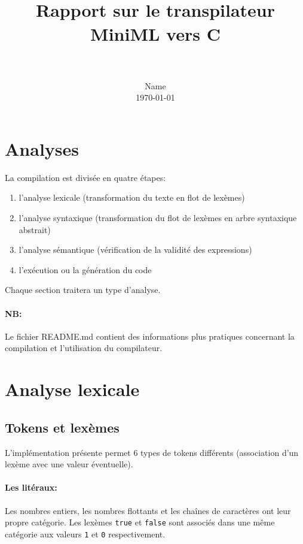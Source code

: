 \documentclass[paper=a4, fontsize=11pt]{scrartcl}
\title{
		\vspace{-1in} 	
		\usefont{OT1}{bch}{b}{n}
		\horrule{0.5pt} \\[0.4cm]
		\huge Rapport sur le transpilateur MiniML vers C \\
		\horrule{2pt} \\[0.5cm]
}
\author{
		\normalfont 								\normalsize
        Name \\[-3pt]		\normalsize
        \today
}
\date{}
\numberwithin{equation}{section}		%
\numberwithin{figure}{section}			%
\numberwithin{table}{section}				%
\begin{document}
\maketitle

\tableofcontents

\newpage
\section{Analyses}

La compilation est divisée en quatre étapes:

\begin{enumerate}
\item l'analyse lexicale (transformation du texte en flot de lexèmes)
\item l'analyse syntaxique (transformation du flot de lexèmes en arbre syntaxique abstrait)
\item l'analyse sémantique (vérification de la validité des expressions)
\item l'exécution ou la génération du code
\end{enumerate} 

Chaque section traitera un type d'analyse.

\paragraph{NB:}
Le fichier README.md contient des informations plus pratiques concernant la compilation et l'utilisation du compilateur.

\newpage
\section{Analyse lexicale}

\subsection{Tokens et lexèmes}

L'implémentation présente permet 6 types de tokens différents (association d'un lexème avec une valeur éventuelle).

\paragraph{Les litéraux:}
Les nombres entiers, les nombres flottants et les chaînes de caractères ont leur propre catégorie.
Les lexèmes \texttt{true} et \texttt{false} sont associés dans une même catégorie aux valeurs \texttt{1} et \texttt{0} respectivement.
\end{document}
